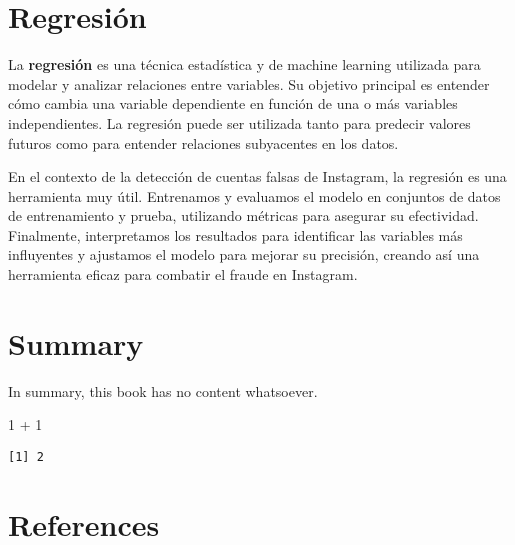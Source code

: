 \documentclass[
  letterpaper,
  DIV=11,
  numbers=noendperiod]{scrreprt}
\newenvironment{Shaded}{\begin{snugshade}}{\end{snugshade}}
\newcommand{\DecValTok}[1]{\textcolor[rgb]{0.68,0.00,0.00}{#1}}
\newcommand{\SpecialCharTok}[1]{\textcolor[rgb]{0.37,0.37,0.37}{#1}}
\newlength{\cslhangindent}
\newenvironment{CSLReferences}[2] %
 {\begin{list}{}{%
  \setlength{\itemindent}{0pt}
  \setlength{\leftmargin}{0pt}
  \setlength{\parsep}{0pt}
  \ifodd #1
   \setlength{\leftmargin}{\cslhangindent}
   \setlength{\itemindent}{-1\cslhangindent}
  \fi
  \setlength{\itemsep}{#2\baselineskip}}}
 {\end{list}}
\begin{document}
\chapter{Regresión}\label{regresiuxf3n}

La \textbf{regresión} es una técnica estadística y de machine learning
utilizada para modelar y analizar relaciones entre variables. Su
objetivo principal es entender cómo cambia una variable dependiente en
función de una o más variables independientes. La regresión puede ser
utilizada tanto para predecir valores futuros como para entender
relaciones subyacentes en los datos.

En el contexto de la detección de cuentas falsas de Instagram, la
regresión es una herramienta muy útil. Entrenamos y evaluamos el modelo
en conjuntos de datos de entrenamiento y prueba, utilizando métricas
para asegurar su efectividad. Finalmente, interpretamos los resultados
para identificar las variables más influyentes y ajustamos el modelo
para mejorar su precisión, creando así una herramienta eficaz para
combatir el fraude en Instagram.


\chapter{}\label{section-1}


\chapter{Summary}\label{summary}

In summary, this book has no content whatsoever.

\begin{Shaded}
\begin{Highlighting}[]
\DecValTok{1} \SpecialCharTok{+} \DecValTok{1}
\end{Highlighting}
\end{Shaded}

\begin{verbatim}
[1] 2
\end{verbatim}


\chapter*{References}\label{references}


\label{refs}
\begin{CSLReferences}{0}{1}
\end{CSLReferences}
\end{document}
